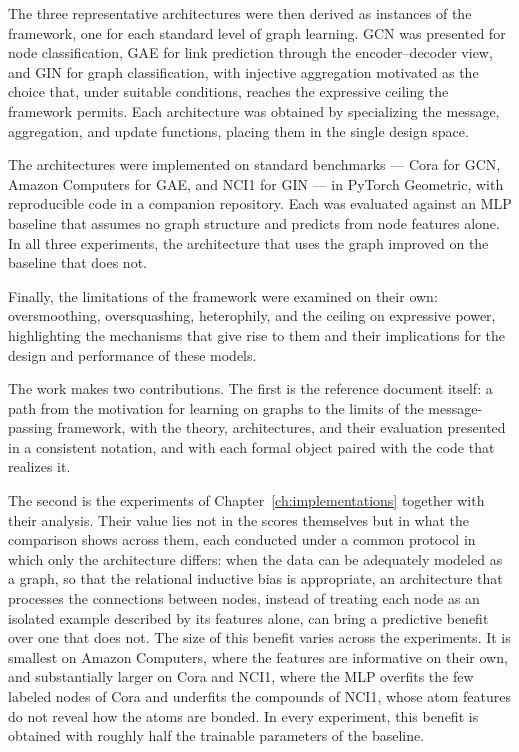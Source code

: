 The three representative architectures were then derived as instances of the
framework, one for each standard level of graph learning. GCN was presented for node
classification, GAE for link prediction through the encoder--decoder view, and
GIN for graph classification, with injective aggregation motivated as the choice that, under suitable
conditions, reaches the expressive ceiling the framework permits. Each architecture was obtained by specializing
the message, aggregation, and update functions, placing them in
the single design space.

The architectures were implemented on standard benchmarks --- Cora for GCN,
Amazon Computers for GAE, and NCI1 for GIN --- in PyTorch Geometric, with
reproducible code in a companion repository. Each was evaluated against an
MLP baseline that assumes no graph structure and predicts from node
features alone. In all three experiments, the architecture that uses the
graph improved on the baseline that does not.

Finally, the limitations of the framework were examined on their own: oversmoothing, 
oversquashing, heterophily, and the ceiling on expressive power, highlighting the 
mechanisms that give rise to them and their implications for the design 
and performance of these models.

The work makes two contributions. The first is the reference document itself:
a path from the motivation for learning on graphs to the limits of the
message-passing framework, with the theory, architectures, and their
evaluation presented in a consistent notation, and with each formal object
paired with the code that realizes it.

The second is the experiments of Chapter~\ref{ch:implementations} together with
their analysis. Their value lies not in the scores themselves but in what the
comparison shows across them, each conducted under a common protocol in which
only the architecture differs: when the data can be adequately modeled as a
graph, so that the relational inductive bias is appropriate, an architecture
that processes the connections between nodes, instead of treating each node as
an isolated example described by its features alone, can bring a predictive
benefit over one that does not. The size of this benefit varies across the
experiments. It is smallest on Amazon Computers, where the features are
informative on their own, and substantially larger on Cora and NCI1, where the
MLP overfits the few labeled nodes of Cora and underfits the compounds of
NCI1, whose atom features do not reveal how the atoms are bonded. In every
experiment, this benefit is obtained with roughly half the trainable
parameters of the baseline.

